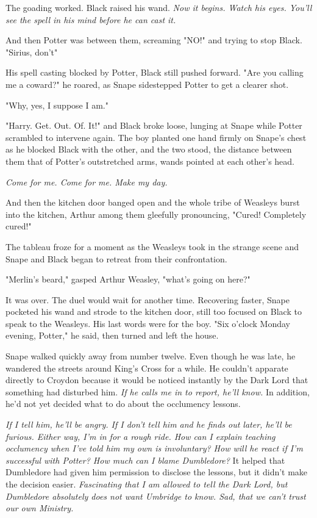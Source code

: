 The goading worked. Black raised his wand. \emph{Now it begins. Watch his eyes. You'll see the spell in his mind before he can cast it.}

And then Potter was between them, screaming "NO!" and trying to stop Black. "Sirius, don't{\el}"

His spell casting blocked by Potter, Black still pushed forward. "Are you calling me a coward?" he roared, as Snape sidestepped Potter to get a clearer shot.

"Why, yes, I suppose I am."

"Harry. Get. Out. Of. It!" and Black broke loose, lunging at Snape while Potter scrambled to intervene again. The boy planted one hand firmly on Snape's chest as he blocked Black with the other, and the two stood, the distance between them that of Potter's outstretched arms, wands pointed at each other's head.

\emph{Come for me. Come for me. Make my day.}

And then the kitchen door banged open and the whole tribe of Weasleys burst into the kitchen, Arthur among them gleefully pronouncing, "Cured! Completely cured!"

The tableau froze for a moment as the Weasleys took in the strange scene and Snape and Black began to retreat from their confrontation.

"Merlin's beard," gasped Arthur Weasley, "what's going on here?"

It was over. The duel would wait for another time. Recovering faster, Snape pocketed his wand and strode to the kitchen door, still too focused on Black to speak to the Weasleys. His last words were for the boy. "Six o'clock Monday evening, Potter," he said, then turned and left the house.

Snape walked quickly away from number twelve. Even though he was late, he wandered the streets around King's Cross for a while. He couldn't apparate directly to Croydon because it would be noticed instantly by the Dark Lord that something had disturbed him. \emph{If he calls me in to report, he'll know.} In addition, he'd not yet decided what to do about the occlumency lessons.

\emph{If I tell him, he'll be angry. If I don't tell him and he finds out later, he'll be furious. Either way, I'm in for a rough ride. How can I explain teaching occlumency when I've told him my own is involuntary? How will he react if I'm successful with Potter? How much can I blame Dumbledore?} It helped that Dumbledore had given him permission to disclose the lessons, but it didn't make the decision easier. \emph{Fascinating that I am allowed to tell the Dark Lord, but Dumbledore absolutely does not want Umbridge to know. Sad, that we can't trust our own Ministry.}

